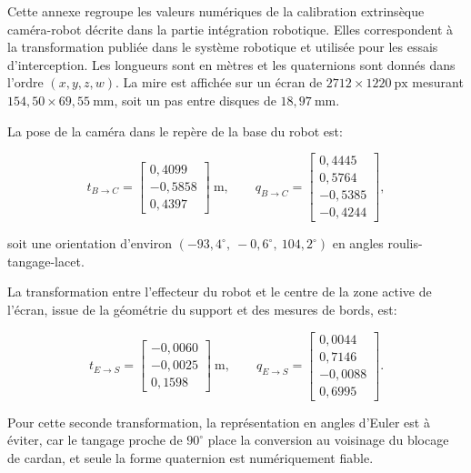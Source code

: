 \documentclass[a4paper,11pt]{report}
\begin{document}
Cette annexe regroupe les valeurs numériques de la calibration extrinsèque caméra-robot décrite dans la partie intégration robotique. Elles correspondent à la transformation publiée dans le système robotique et utilisée pour les essais d'interception. Les longueurs sont en mètres et les quaternions sont donnés dans l'ordre \((x, y, z, w)\). La mire est affichée sur un écran de \(2712 \times 1220~\text{px}\) mesurant \(154{,}50 \times 69{,}55~\text{mm}\), soit un pas entre disques de \(18{,}97~\text{mm}\).

La pose de la caméra dans le repère de la base du robot est:

\begin{equation}
t_{B \to C} =
\begin{bmatrix}
0{,}4099 \\
-0{,}5858 \\
0{,}4397
\end{bmatrix}~\text{m},
\qquad
q_{B \to C} =
\begin{bmatrix}
0{,}4445 \\
0{,}5764 \\
-0{,}5385 \\
-0{,}4244
\end{bmatrix},
\label{eq:pose-camera-base-num}
\end{equation}

soit une orientation d'environ \((-93{,}4^\circ,\ -0{,}6^\circ,\ 104{,}2^\circ)\) en angles roulis-tangage-lacet.

La transformation entre l'effecteur du robot et le centre de la zone active de l'écran, issue de la géométrie du support et des mesures de bords, est:

\begin{equation}
t_{E \to S} =
\begin{bmatrix}
-0{,}0060 \\
-0{,}0025 \\
0{,}1598
\end{bmatrix}~\text{m},
\qquad
q_{E \to S} =
\begin{bmatrix}
0{,}0044 \\
0{,}7146 \\
-0{,}0088 \\
0{,}6995
\end{bmatrix}.
\label{eq:pose-mire-effecteur-num}
\end{equation}

Pour cette seconde transformation, la représentation en angles d'Euler est à éviter, car le tangage proche de \(90^\circ\) place la conversion au voisinage du blocage de cardan, et seule la forme quaternion est numériquement fiable.
\end{document}
